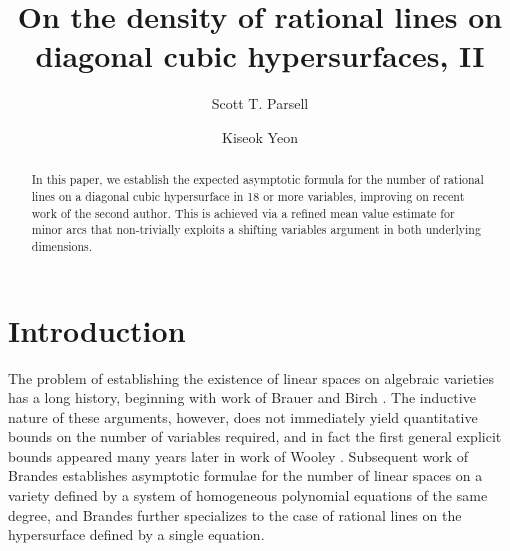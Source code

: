 \documentclass{amsart}%
\numberwithin{equation}{section}
\theoremstyle{remark}
\newcommand{\1}{\mathbbm{1}}
\begin{document}
\title[]{On the density of rational lines on diagonal cubic hypersurfaces, II}


\author{Scott T. Parsell} \address{ Scott T. Parsell\\  
Department of Mathematics, West Chester University, United States}

\author{Kiseok Yeon} \address{ Kiseok Yeon\\
Department of Mathematics, University of California, Davis, United States}






\begin{abstract}

In this paper, we establish the expected asymptotic formula for the number of rational lines on a diagonal cubic hypersurface in 18 or more variables, improving on recent work of the second author. This is achieved via a refined mean value estimate for minor arcs that non-trivially exploits a shifting variables argument in both underlying dimensions. 


\end{abstract}


\maketitle




\section{Introduction}

The problem of establishing the existence of linear spaces on algebraic varieties has a long history, beginning with work of Brauer \cite{MR13127} and Birch \cite{MR97359}. The inductive nature of these arguments, however, does not immediately yield quantitative bounds on the number of variables required, and in fact the first general explicit bounds appeared many years later in work of Wooley \cite{MR1623369}. Subsequent work of Brandes \cite{MR3198749} establishes asymptotic formulae for the number of linear spaces on a variety defined by a system of homogeneous polynomial equations of the same degree, and Brandes \cite{MR4259461} further specializes to the case of rational lines on the hypersurface defined by a single equation.
\end{document}
